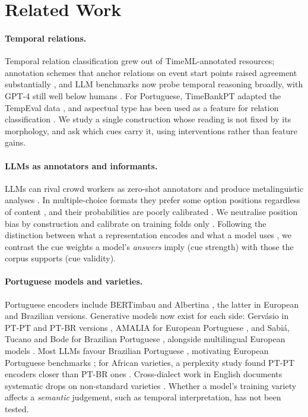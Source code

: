 \documentclass[11pt]{article}
\begin{document}
\section{Related Work}
\label{sec:related}

\paragraph{Temporal relations.} Temporal relation classification grew out of TimeML-annotated resources; annotation schemes that anchor relations on event start points raised agreement substantially \citep{ning-etal-2018-multi}, and LLM benchmarks now probe temporal reasoning broadly, with GPT-4 still well below humans \citep{wang-zhao-2024-tram}. For Portuguese, TimeBankPT adapted the TempEval data \citep{costa-branco-2012-timebankpt}, and aspectual type has been used as a feature for relation classification \citep{costa-branco-2012-aspectual}. We study a single construction whose reading is not fixed by its morphology, and ask which cues carry it, using interventions rather than feature gains.

\paragraph{LLMs as annotators and informants.} LLMs can rival crowd workers as zero-shot annotators \citep{gilardi2023chatgpt} and produce metalinguistic analyses \citep{begus2025large}. In multiple-choice formats they prefer some option positions regardless of content \citep{zheng2024selection,pezeshkpour2024order}, and their probabilities are poorly calibrated \citep{guo2017calibration,zhao2021calibrate}. We neutralise position bias by construction and calibrate on training folds only \citep{kull2019dirichlet}. Following the distinction between what a representation encodes and what a model uses \citep{belinkov-2022-probing,elazar-etal-2021-amnesic}, we contrast the cue weights a model's \emph{answers} imply (cue strength) with those the corpus supports (cue validity).

\paragraph{Portuguese models and varieties.} Portuguese encoders include BERTimbau \citep{souza2020bertimbau} and Albertina \citep{rodrigues2023albertina}, the latter in European and Brazilian versions. Generative models now exist for each side: Gervásio in PT-PT and PT-BR versions \citep{santos2024gervasio}, AMALIA for European Portuguese \citep{simplicio2026amalia}, and Sabiá, Tucano and Bode for Brazilian Portuguese \citep{pires2023sabia,correa2024tucano,garcia2024bode}, alongside multilingual European models \citep{martins2024eurollm,gonzalezagirre2025salamandra}. Most LLMs favour Brazilian Portuguese \citep{ferreira2026p3b3}, motivating European Portuguese benchmarks \citep{vieira2026alba}; for African varieties, a perplexity study found PT-PT encoders closer than PT-BR ones \citep{alves-etal-2024-african}. Cross-dialect work in English documents systematic drops on non-standard varieties \citep{ziems-etal-2023-multi}. Whether a model's training variety affects a \emph{semantic} judgement, such as temporal interpretation, has not been tested.
\end{document}
